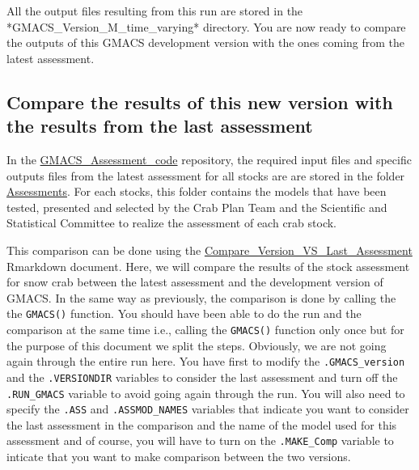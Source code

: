 \documentclass[
]{article}
\begin{document}
All the output files resulting from this run are stored in the
*GMACS\Dvpt\_Version\build\SNOW\_M\_time\_varying* directory. You are
now ready to compare the outputs of this GMACS development version with
the ones coming from the latest assessment.

\hypertarget{compare-the-results-of-this-new-version-with-the-results-from-the-last-assessment}{%
\subsection{Compare the results of this new version with the results
from the last
assessment}\label{compare-the-results-of-this-new-version-with-the-results-from-the-last-assessment}}

In the
\href{https://github.com/GMACS-project/GMACS_Assessment_code}{GMACS\_Assessment\_code}
repository, the required input files and specific outputs files from the
latest assessment for all stocks are are stored in the folder
\href{https://github.com/GMACS-project/GMACS_Assessment_code/tree/main/Assessments}{Assessments}.
For each stocks, this folder contains the models that have been tested,
presented and selected by the Crab Plan Team and the Scientific and
Statistical Committee to realize the assessment of each crab stock.

This comparison can be done using the
\href{https://github.com/GMACS-project/GMACS_Assessment_code/blob/main/GMACS/Compare_Version_VS_Last_Assessment.Rmd}{Compare\_Version\_VS\_Last\_Assessment}
Rmarkdown document. Here, we will compare the results of the stock
assessment for snow crab between the latest assessment and the
development version of GMACS. In the same way as previously, the
comparison is done by calling the the \texttt{GMACS()} function. You
should have been able to do the run and the comparison at the same time
i.e., calling the \texttt{GMACS()} function only once but for the
purpose of this document we split the steps. Obviously, we are not going
again through the entire run here. You have first to modify the
\texttt{.GMACS\_version} and the \texttt{.VERSIONDIR} variables to
consider the last assessment and turn off the \texttt{.RUN\_GMACS}
variable to avoid going again through the run. You will also need to
specify the \texttt{.ASS} and \texttt{.ASSMOD\_NAMES} variables that
indicate you want to consider the last assessment in the comparison and
the name of the model used for this assessment and of course, you will
have to turn on the \texttt{.MAKE\_Comp} variable to inticate that you
want to make comparison between the two versions.
\end{document}
